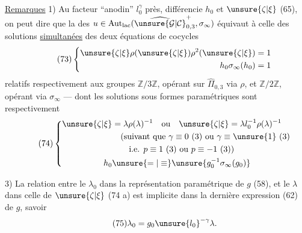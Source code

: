 \uline{Remarques} 1) Au facteur ``anodin'' $l_0^\gamma$ près,  différencie $h_0$ et $\unsure{\zeta|\xi}$ (65), on peut dire que la  des
$u\in\mathrm{Aut}_{\mathrm{lac}}(\widehat{\unsure{\mathcal{G}|\mathcal{C}}}_{0,3}^{+},\sigma_\infty)$
équivaut à celle des  solutions \uline{simultanées} des deux équations de cocycles
\[
\tag{73}
\left\{
\begin{aligned}
\unsure{\zeta|\xi}\rho(\unsure{\zeta|\xi})\rho^2(\unsure{\zeta|\xi})&=1\\
h_0\sigma_\infty(h_0)&=1
\end{aligned}
\right.
\]
relatifs respectivement aux groupes $\mathbb Z/3\mathbb Z$, opérant sur $\widehat{\Pi}_{0,3}$ via $\rho$, et $\mathbb Z/2\mathbb Z$, opérant via $\sigma_\infty$ --- dont les solutions sous formes paramétriques sont respectivement
\[
\tag{74}
\left\{
\begin{aligned}
\unsure{\zeta|\xi}&=\lambda\rho(\lambda)^{-1}\quad\text{ou}\quad
 \unsure{\zeta|\xi}=\lambda l_0^{-1}\rho(\lambda)^{-1}\\
&\quad\text{(suivant que }\gamma\equiv0\ (3)\text{ ou }\gamma\equiv\unsure{1}\ (3)\\
&\qquad\text{i.e. }p\equiv1\ (3)\text{ ou }p\equiv-1\ (3)\text{)}\\
h_0&\unsure{=|\equiv}\unsure{g_0^{-1}\sigma_\infty(g_0)}
\end{aligned}
\right.
\]


3) La relation entre le $\lambda_0$ dans la représentation paramétrique de $g$ (58), et le $\lambda$ dans celle de $\unsure{\zeta|\xi}$ (74 a) est implicite dans la dernière expression (62) de $g$, savoir
\[
\tag{75}
\lambda_0=g_0\unsure{l_0}^{-\gamma}\lambda.
\]

